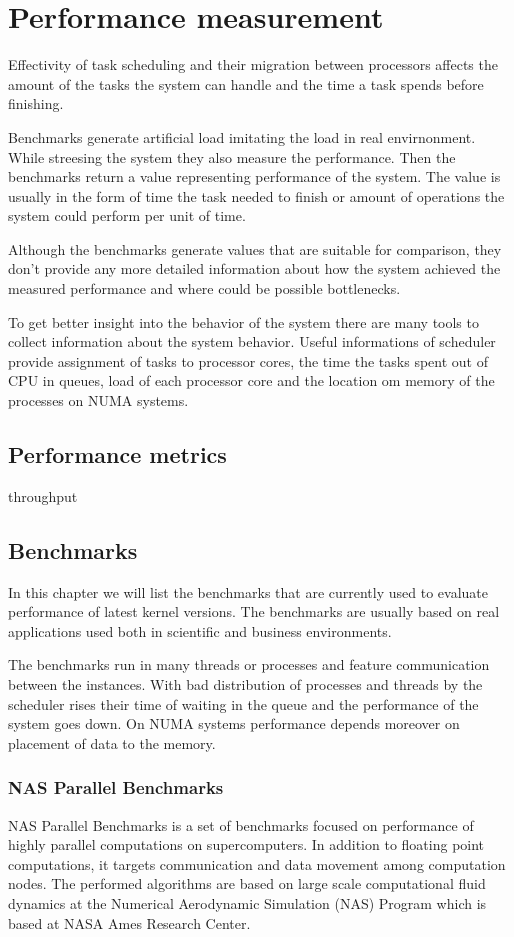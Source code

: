 \chapter{Performance measurement}
Effectivity of task scheduling and their migration between processors affects
the amount of the tasks the system can handle and the time a task spends before
finishing.

Benchmarks generate artificial load imitating the load in real envirnonment.
While streesing the system they also measure the performance. Then the
benchmarks return a value representing performance of the system. The value is
usually in the form of time the task needed to finish or amount of operations
the system could perform per unit of time.

Although the benchmarks generate values that are suitable for comparison, they
don't provide any more detailed information about how the system achieved the
measured performance and where could be possible bottlenecks.

To get better insight into the behavior of the system there are many tools to
collect information about the system behavior. Useful informations of scheduler
provide assignment of tasks to processor cores, the time the tasks spent out of
CPU in queues, load of each processor core and the location om memory of the
processes on NUMA systems. 

\section{Performance metrics}
throughput

\section{Benchmarks}
In this chapter we will list the benchmarks that are currently used to evaluate
performance of latest kernel versions. The benchmarks are usually based on real
applications used both in scientific and business environments.

The benchmarks run in many threads or processes and feature communication
between the instances. With bad distribution of processes and threads by the
scheduler rises their time of waiting in the queue and the performance of the
system goes down. On NUMA systems performance depends moreover on placement of
data to the memory.

\subsection{NAS Parallel Benchmarks}
NAS Parallel Benchmarks is a set of benchmarks focused on performance of highly
parallel computations on supercomputers. In addition to floating point
computations, it targets communication and data movement among computation
nodes. The performed algorithms are based on large scale computational fluid
dynamics at the Numerical Aerodynamic Simulation (NAS) Program which is based at
NASA Ames Research Center.

